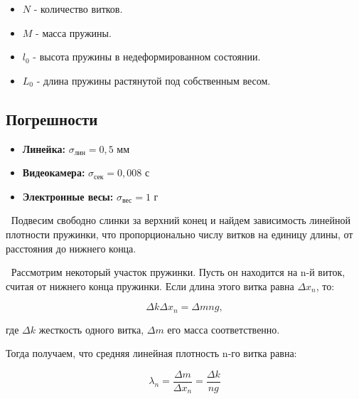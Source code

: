 \documentclass[a4paper, 12pt]{article}
\begin{document}
\begin{itemize}
    \item $ N $ - количество витков. 
    \item $ M $ - масса пружины. 
    \item $ l_{0} $ - высота пружины в недеформированном состоянии.
    \item $ L_{0} $ - длина пружины растянутой под собственным весом.
\end{itemize}

\begin{center}    
\subsection*{Погрешности}
\end{center}

\begin{itemize}
	\item \textbf{Линейка:} $ \sigma_\text{лин} = 0,5 $ мм
	\item \textbf{Видеокамера:} $ \sigma_\text{сек} = 0,008 $ с
	\item \textbf{Электронные весы:} $ \sigma_\text{вес} = 1 $ г
\end{itemize}

$\>$ Подвесим свободно слинки за верхний конец и найдем зависимость линейной плотности пружинки, что пропорционально числу витков на единицу длины,
от расстояния до нижнего конца. 

\bigskip

$\>$ Рассмотрим некоторый участок пружинки. Пусть он находится на n-й виток,
считая от нижнего конца пружинки. Если длина этого витка равна $\varDelta x_{n}$, то:

\begin{equation}
    \varDelta k \varDelta x_{n} = \varDelta m n g,    
\end{equation}

\bigskip

где $\varDelta k$ жесткость одного витка, $\varDelta m $ его масса соответственно.

\bigskip

Тогда получаем, что средняя линейная плотность n-го витка равна:

\bigskip

\begin{equation}
    \lambda_{n} = \frac{\varDelta m}{\varDelta x_{n}} = \frac{\varDelta k}{ng}
\end{equation}
\end{document}
